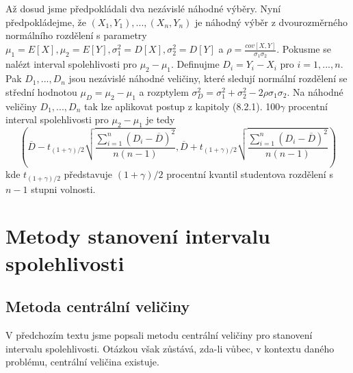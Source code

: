 Až dosud jsme předpokládali dva nezávislé náhodné výběry. Nyní předpokládejme, že $(X_1, Y_1), ..., (X_n, Y_n)$ je náhodný výběr z dvourozměrného normálního rozdělení s parametry $\mu_1 = E[X], \mu_2 = E[Y], \sigma_1^2 = D[X], \sigma_2^2 = D[Y]$ a $\rho = \frac{cov[X,Y]}{\sigma_1 \sigma_2}$. Pokusme se nalézt interval spolehlivosti pro $\mu_2 - \mu_1$. Definujme $D_i = Y_i - X_i$ pro $i = 1, ..., n$. Pak $D_1, ..., D_n$ jsou nezávislé náhodné veličiny, které sledují normální rozdělení se střední hodnotou $\mu_D = \mu_2 - \mu_1$ a rozptylem $\sigma_D^2 = \sigma_1^2 + \sigma_2^2 - 2 \rho \sigma_1 \sigma_2$. Na náhodné veličiny $D_1, ..., D_n$ tak lze aplikovat postup z kapitoly (8.2.1). 100$\gamma$ procentní interval spolehlivosti pro $\mu_2 - \mu_1$ je tedy
\begin{equation*}
\left(\overline{D} - t_{(1 + \gamma) / 2} \sqrt{\frac{\sum_{i = 1}^n (D_i - \overline{D})^2}{n(n - 1)}}, \overline{D} + t_{(1 + \gamma) / 2} \sqrt{\frac{\sum_{i = 1}^n (D_i - \overline{D})^2}{n(n - 1)}}\right)
\end{equation*}
kde $t_{(1 + \gamma) / 2}$ představuje $(1 + \gamma) / 2$ procentní kvantil studentova rozdělení s $n - 1$ stupni volnosti.

\section{Metody stanovení intervalu spolehlivosti}

\subsection{Metoda centrální veličiny}

V předchozím textu jsme popsali metodu centrální veličiny pro stanovení intervalu spolehlivosti. Otázkou však zůstává, zda-li vůbec, v kontextu daného problému, centrální veličina existuje.

